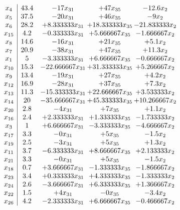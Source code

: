 \documentclass[11pt]{article}
\begin{document}
\[\begin{array}{c| c c@{\hskip 2pt} c@{\hskip 2pt} c@{\hskip 2pt} }
 x_{4}   &  43.4 & -17 x_{31} & + 47 x_{35} & -12.6 x_{2}\\
 x_{5}   &  37.5 & -20 x_{31} & + 46 x_{35} & -9 x_{2}\\
 x_{6}   &  28.2 & + 8.333333 x_{31} & + 18.333333 x_{35} & -21.833333 x_{2}\\
 x_{15}   &  4.2 & -0.333333 x_{31} & + 5.666667 x_{35} & -1.666667 x_{2}\\
 x_{8}   &  14.6 & -16 x_{31} & + 21 x_{35} & + 5.1 x_{2}\\
 x_{7}   &  20.9 & -38 x_{31} & + 47 x_{35} & + 11.3 x_{2}\\
 x_{1}   &  5 & -3.333333 x_{31} & + 6.666667 x_{35} & -0.666667 x_{2}\\
 x_{10}   &  15.3 & -22.666667 x_{31} & + 31.333333 x_{35} & + 5.266667 x_{2}\\
 x_{9}   &  13.4 & -19 x_{31} & + 27 x_{35} & + 4.2 x_{2}\\
 x_{12}   &  16.9 & -28 x_{31} & + 37 x_{35} & + 7.3 x_{2}\\
 x_{13}   &  11.3 & -15.333333 x_{31} & + 22.666667 x_{35} & + 3.533333 x_{2}\\
 x_{14}   &  20 & -35.666667 x_{31} & + 45.333333 x_{35} & + 10.266667 x_{2}\\
 x_{20}   &  2.8 & -4 x_{31} & + 7 x_{35} & + 1.1 x_{2}\\
 x_{16}   &  2.4 & + 2.333333 x_{31} & + 1.333333 x_{35} & -1.733333 x_{2}\\
 x_{3}   &  1 & + 6.666667 x_{31} & -3.333333 x_{35} & -4.666667 x_{2}\\
 x_{17}   &  3.3 & -0 x_{31} & + 5 x_{35} & -1.5 x_{2}\\
 x_{19}   &  2.5 & -3 x_{31} & + 5 x_{35} & + 1.3 x_{2}\\
 x_{11}   &  3.7 & -6.333333 x_{31} & + 8.666667 x_{35} & + 2.133333 x_{2}\\
 x_{21}   &  3.3 & -0 x_{31} & + 5 x_{35} & -1.5 x_{2}\\
 x_{18}   &  0.7 & + 3.666667 x_{31} & -1.333333 x_{35} & -1.866667 x_{2}\\
 x_{23}   &  3.4 & + 0.333333 x_{31} & + 4.333333 x_{35} & -1.333333 x_{2}\\
 x_{24}   &  2.6 & -3.666667 x_{31} & + 6.333333 x_{35} & + 1.366667 x_{2}\\
 x_{22}   &  1.5 & + 4 x_{31} & -0 x_{35} & -3.4 x_{2}\\
 x_{26}   &  4.2 & -2.333333 x_{31} & + 6.666667 x_{35} & -0.466667 x_{2}\\

\end{array}\]
\end{document}

